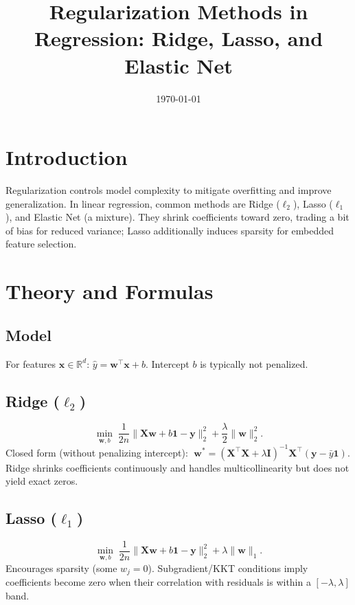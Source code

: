 \documentclass{article}
\title{Regularization Methods in Regression: Ridge, Lasso, and Elastic Net}
\author{}
\date{\today}
\begin{document}
\maketitle
\tableofcontents

\section{Introduction}
Regularization controls model complexity to mitigate overfitting and improve generalization. In linear regression, common methods are Ridge (\(\ell_2\)), Lasso (\(\ell_1\)), and Elastic Net (a mixture). They shrink coefficients toward zero, trading a bit of bias for reduced variance; Lasso additionally induces sparsity for embedded feature selection.

\section{Theory and Formulas}
\subsection{Model}
For features \(\mathbf{x} \in \mathbb{R}^d\): \(\hat{y} = \mathbf{w}^\top \mathbf{x} + b\). Intercept \(b\) is typically not penalized.

\subsection{Ridge (\(\ell_2\))}
\begin{equation}
\min_{\mathbf{w},b}\; \frac{1}{2n}\lVert \mathbf{X}\mathbf{w} + b\mathbf{1} - \mathbf{y} \rVert_2^2 + \frac{\lambda}{2} \lVert \mathbf{w} \rVert_2^2.
\end{equation}
Closed form (without penalizing intercept): \(\;\mathbf{w}^* = (\mathbf{X}^\top\mathbf{X} + \lambda \mathbf{I})^{-1}\mathbf{X}^\top(\mathbf{y}-\bar{y}\mathbf{1})\). Ridge shrinks coefficients continuously and handles multicollinearity but does not yield exact zeros.

\subsection{Lasso (\(\ell_1\))}
\begin{equation}
\min_{\mathbf{w},b}\; \frac{1}{2n}\lVert \mathbf{X}\mathbf{w} + b\mathbf{1} - \mathbf{y} \rVert_2^2 + \lambda \lVert \mathbf{w} \rVert_1.
\end{equation}
Encourages sparsity (some \(w_j=0\)). Subgradient/KKT conditions imply coefficients become zero when their correlation with residuals is within a \([-\lambda,\lambda]\) band.
\end{document}
